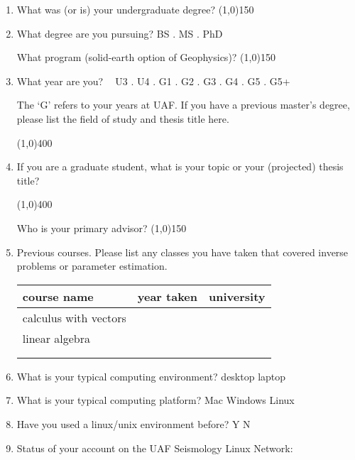 \documentclass[11pt,titlepage,fleqn]{article}
\begin{document}
\begin{enumerate}
\item What was (or is) your undergraduate degree? \line(1,0){150}

\item What degree are you pursuing? BS . MS . PhD

\noindent
What program (\eg solid-earth option of Geophysics)? \line(1,0){150}

\item What year are you? $\;\;$ U3 . U4 . G1 . G2 . G3 . G4 . G5 . G5+

The `G' refers to your years at UAF. If you have a previous master's degree, please list the field of study and thesis title here.

\noindent \line(1,0){400}

\item If you are a graduate student, what is your topic or your (projected) thesis title?

\noindent \line(1,0){400}

\noindent Who is your primary advisor? \noindent \line(1,0){150}

\item Previous courses. Please list any classes you have taken that covered
inverse problems or parameter estimation.

\begin{tabular}{l|l|l}
\hline
course name & year taken & university \\ \hline\hline
calculus with vectors & & \hspace{3cm} \\ \hline
linear algebra & & \\ \hline
\hspace{8cm}  & & \\ \hline
 & & \\ \hline
\end{tabular}

\item What is your typical computing environment? desktop laptop

\item What is your typical computing platform? Mac Windows Linux

\item Have you used a linux/unix environment before? Y N

\item Status of your account on the UAF Seismology Linux Network:


\end{enumerate}
\end{document}
